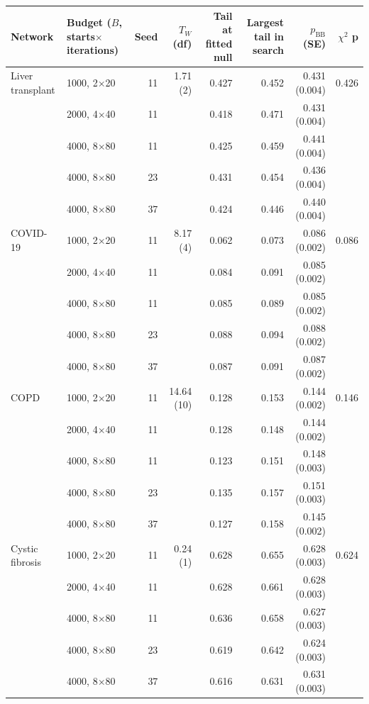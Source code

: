 \begin{tabular}{llrrrrrr}
\toprule
Network & Budget ($B$, starts$\times$iterations) & Seed & $T_W$ (df) & Tail at fitted null & Largest tail in search & $p_{\mathrm{BB}}$ (SE) & $\chi^2$ p \\
\midrule
Liver transplant & 1000, 2$\times$20 & 11 & 1.71 (2) & 0.427 & 0.452 & 0.431 (0.004) & 0.426 \\
 & 2000, 4$\times$40 & 11 &  & 0.418 & 0.471 & 0.431 (0.004) &  \\
 & 4000, 8$\times$80 & 11 &  & 0.425 & 0.459 & 0.441 (0.004) &  \\
 & 4000, 8$\times$80 & 23 &  & 0.431 & 0.454 & 0.436 (0.004) &  \\
 & 4000, 8$\times$80 & 37 &  & 0.424 & 0.446 & 0.440 (0.004) &  \\
\addlinespace
COVID-19 & 1000, 2$\times$20 & 11 & 8.17 (4) & 0.062 & 0.073 & 0.086 (0.002) & 0.086 \\
 & 2000, 4$\times$40 & 11 &  & 0.084 & 0.091 & 0.085 (0.002) &  \\
 & 4000, 8$\times$80 & 11 &  & 0.085 & 0.089 & 0.085 (0.002) &  \\
 & 4000, 8$\times$80 & 23 &  & 0.088 & 0.094 & 0.088 (0.002) &  \\
 & 4000, 8$\times$80 & 37 &  & 0.087 & 0.091 & 0.087 (0.002) &  \\
\addlinespace
COPD & 1000, 2$\times$20 & 11 & 14.64 (10) & 0.128 & 0.153 & 0.144 (0.002) & 0.146 \\
 & 2000, 4$\times$40 & 11 &  & 0.128 & 0.148 & 0.144 (0.002) &  \\
 & 4000, 8$\times$80 & 11 &  & 0.123 & 0.151 & 0.148 (0.003) &  \\
 & 4000, 8$\times$80 & 23 &  & 0.135 & 0.157 & 0.151 (0.003) &  \\
 & 4000, 8$\times$80 & 37 &  & 0.127 & 0.158 & 0.145 (0.002) &  \\
\addlinespace
Cystic fibrosis & 1000, 2$\times$20 & 11 & 0.24 (1) & 0.628 & 0.655 & 0.628 (0.003) & 0.624 \\
 & 2000, 4$\times$40 & 11 &  & 0.628 & 0.661 & 0.628 (0.003) &  \\
 & 4000, 8$\times$80 & 11 &  & 0.636 & 0.658 & 0.627 (0.003) &  \\
 & 4000, 8$\times$80 & 23 &  & 0.619 & 0.642 & 0.624 (0.003) &  \\
 & 4000, 8$\times$80 & 37 &  & 0.616 & 0.631 & 0.631 (0.003) &  \\
\bottomrule
\end{tabular}
